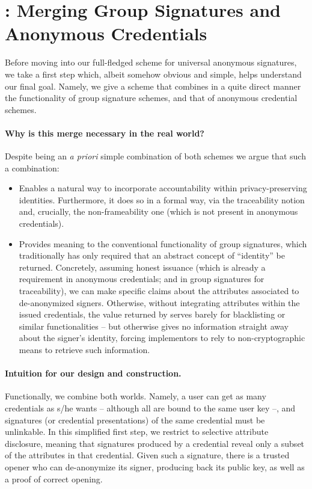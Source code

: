 \section{\GSAC: Merging Group Signatures and Anonymous
  Credentials}
\label{sec:gsac}

Before moving into our full-fledged scheme for universal anonymous signatures,
we take a first step which, albeit somehow obvious and simple, helps understand
our final goal. Namely, we give a scheme that combines in a quite direct manner
the functionality of group signature schemes, and that of anonymous credential
schemes.

\paragraph{Why is this merge necessary in the real world?} %
Despite being an \emph{a priori} simple combination of both schemes we argue
that such a combination:

\begin{itemize}
\item Enables a natural way to incorporate accountability within 
  privacy-preserving identities. Furthermore, it does so in a formal way,
  via the traceability notion and, crucially, the non-frameability one
  (which is not present in anonymous credentials).
\item Provides meaning to the conventional \Open functionality of group
  signatures, which traditionally has only required that an abstract concept of
  ``identity'' be returned. Concretely, assuming honest issuance (which is
  already a requirement in anonymous credentials; and in group signatures for
  traceability), we can make specific claims about the attributes associated to
  de-anonymized signers. Otherwise, without integrating attributes within the
  issued credentials, the value returned by \Open serves barely for blacklisting
  or similar functionalities -- but otherwise gives no information straight away
  about the signer's identity, forcing implementors to rely to non-cryptographic
  means to retrieve such information.
\end{itemize}

\paragraph{Intuition for our design and construction.} %
Functionally, we combine both worlds. Namely, a user can get as many credentials
as s/he wants -- although all are bound to the same user key --, and signatures
(or credential presentations) of the same credential must be unlinkable. In this
simplified first step, we restrict to selective attribute disclosure, meaning
that signatures produced by a credential reveal only a subset of the attributes
in that credential. Given such a signature, there is a trusted opener who can
de-anonymize its signer, producing back its public key, as well as a proof of
correct opening.

